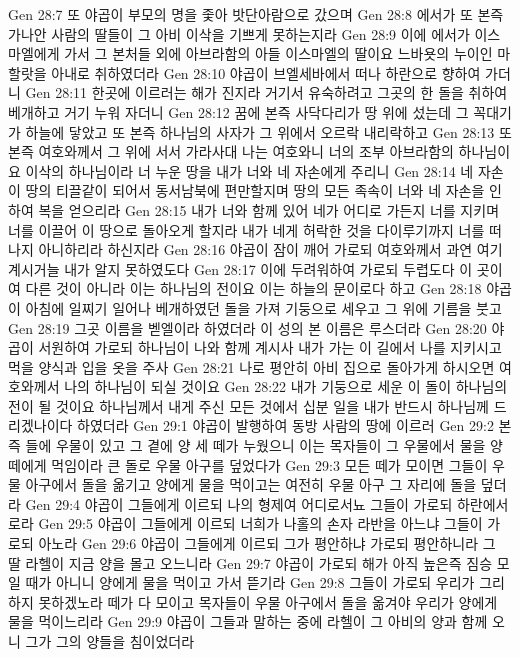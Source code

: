 Gen 28:7  또 야곱이 부모의 명을 좇아 밧단아람으로 갔으며
Gen 28:8  에서가 또 본즉 가나안 사람의 딸들이 그 아비 이삭을 기쁘게 못하는지라
Gen 28:9  이에 에서가 이스마엘에게 가서 그 본처들 외에 아브라함의 아들 이스마엘의 딸이요 느바욧의 누이인 마할랏을 아내로 취하였더라
Gen 28:10  야곱이 브엘세바에서 떠나 하란으로 향하여 가더니
Gen 28:11  한곳에 이르러는 해가 진지라 거기서 유숙하려고 그곳의 한 돌을 취하여 베개하고 거기 누워 자더니
Gen 28:12  꿈에 본즉 사닥다리가 땅 위에 섰는데 그 꼭대기가 하늘에 닿았고 또 본즉 하나님의 사자가 그 위에서 오르락 내리락하고
Gen 28:13  또 본즉 여호와께서 그 위에 서서 가라사대 나는 여호와니 너의 조부 아브라함의 하나님이요 이삭의 하나님이라 너 누운 땅을 내가 너와 네 자손에게 주리니
Gen 28:14  네 자손이 땅의 티끌같이 되어서 동서남북에 편만할지며 땅의 모든 족속이 너와 네 자손을 인하여 복을 얻으리라
Gen 28:15  내가 너와 함께 있어 네가 어디로 가든지 너를 지키며 너를 이끌어 이 땅으로 돌아오게 할지라 내가 네게 허락한 것을 다이루기까지 너를 떠나지 아니하리라 하신지라
Gen 28:16  야곱이 잠이 깨어 가로되 여호와께서 과연 여기 계시거늘 내가 알지 못하였도다
Gen 28:17  이에 두려워하여 가로되 두렵도다 이 곳이여 다른 것이 아니라 이는 하나님의 전이요 이는 하늘의 문이로다 하고
Gen 28:18  야곱이 아침에 일찌기 일어나 베개하였던 돌을 가져 기둥으로 세우고 그 위에 기름을 붓고
Gen 28:19  그곳 이름을 벧엘이라 하였더라 이 성의 본 이름은 루스더라
Gen 28:20  야곱이 서원하여 가로되 하나님이 나와 함께 계시사 내가 가는 이 길에서 나를 지키시고 먹을 양식과 입을 옷을 주사
Gen 28:21  나로 평안히 아비 집으로 돌아가게 하시오면 여호와께서 나의 하나님이 되실 것이요
Gen 28:22  내가 기둥으로 세운 이 돌이 하나님의 전이 될 것이요 하나님께서 내게 주신 모든 것에서 십분 일을 내가 반드시 하나님께 드리겠나이다 하였더라
Gen 29:1  야곱이 발행하여 동방 사람의 땅에 이르러
Gen 29:2  본즉 들에 우물이 있고 그 곁에 양 세 떼가 누웠으니 이는 목자들이 그 우물에서 물을 양떼에게 먹임이라 큰 돌로 우물 아구를 덮었다가
Gen 29:3  모든 떼가 모이면 그들이 우물 아구에서 돌을 옮기고 양에게 물을 먹이고는 여전히 우물 아구 그 자리에 돌을 덮더라
Gen 29:4  야곱이 그들에게 이르되 나의 형제여 어디로서뇨 그들이 가로되 하란에서로라
Gen 29:5  야곱이 그들에게 이르되 너희가 나홀의 손자 라반을 아느냐 그들이 가로되 아노라
Gen 29:6  야곱이 그들에게 이르되 그가 평안하냐 가로되 평안하니라 그 딸 라헬이 지금 양을 몰고 오느니라
Gen 29:7  야곱이 가로되 해가 아직 높은즉 짐승 모일 때가 아니니 양에게 물을 먹이고 가서 뜯기라
Gen 29:8  그들이 가로되 우리가 그리하지 못하겠노라 떼가 다 모이고 목자들이 우물 아구에서 돌을 옮겨야 우리가 양에게 물을 먹이느리라
Gen 29:9  야곱이 그들과 말하는 중에 라헬이 그 아비의 양과 함께 오니 그가 그의 양들을 침이었더라
